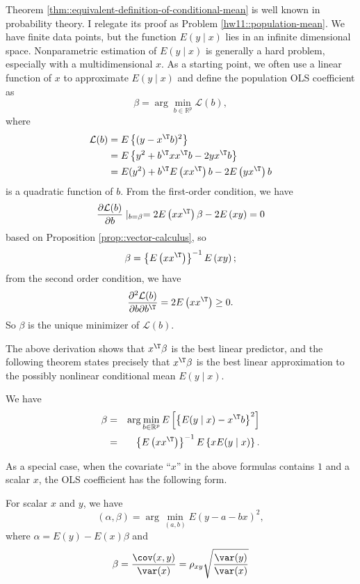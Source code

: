 Theorem \ref{thm::equivalent-definition-of-conditional-mean} is well known in probability theory. I relegate its proof as  Problem \ref{hw11::population-mean}. 
We have finite data points, but the function $E(y\mid x)$ lies in
an infinite dimensional space. Nonparametric estimation of $E(y\mid x)$
is generally a hard problem, especially with a multidimensional $x$.
As a starting point, we often use a linear function of $x$ to approximate
$E(y\mid x)$ and define the population OLS coefficient as
\[
\beta=\arg\min_{b\in\mathbb{R}^{p}} \mathcal{L}(b) ,
\]
where
\begin{align*}
\mathcal{L}(b) & =E\left\{ (y-x^{\T}b)^{2}\right\} \\
 & =E\left\{ y^{2}+b^{\T}xx^{\T}b-2yx^{\T}b\right\} \\
 & =E(y^{2})+b^{\T}E\left(xx^{\T}\right)b-2E\left(yx^{\T}\right)b 
\end{align*}
 is a quadratic function of $b$. From the first-order condition,
we have
\[
\frac{\partial\mathcal{L}(b)}{\partial b}\mid_{b=\beta}=2E\left(xx^{\T}\right)\beta-2E\left(xy\right)=0
\]
based on Proposition \ref{prop::vector-calculus}, 
so
\begin{equation}
\label{eq::pols-formula}
\beta=\left\{ E\left(xx^{\T}\right)\right\} ^{-1}E\left(xy\right);
\end{equation}
from the second order condition, we have
\[
\frac{\partial^{2}\mathcal{L}(b)}{\partial b\partial b^{\T}}=2E\left(xx^{\T}\right)\geq0.
\]
So $\beta$ is the unique minimizer of $\mathcal{L}(b)$. 


The above derivation shows that $x^{\T}\beta$ is the best linear predictor,
and the following theorem states precisely that $x^{\T}\beta$ is
the best linear approximation to the possibly nonlinear conditional mean $E(y\mid x).$
\begin{theorem}
\label{thm:bestlinear-conditionalmean}
We have
\begin{eqnarray*}
\beta &=& \arg\min_{b\in\mathbb{R}^{p}}E\left[\left\{ E(y\mid x)-x^{\T}b\right\} ^{2}\right] \\
&=& \left\{ E\left(xx^{\T}\right)\right\} ^{-1}E\left\{ xE(y\mid x)\right\} .
\end{eqnarray*}
\end{theorem}
 

As a special case, when the covariate ``$x$'' in the above formulas contains $1$ and a scalar $x$,
the OLS coefficient has the following form.
\begin{corollary}
\label{corollary:scalar-pop-ols}
For scalar $x$ and $y$, we have 
\[
(\alpha,\beta)=\arg\min_{(a,b)}E(y-a-bx)^{2},
\]
where $\alpha=E(y)-E(x)\beta$ and 
\[
\beta=\frac{\cov(x,y)}{\var(x)} = \rho_{xy} \sqrt{   \frac{\var(y)}{\var(x)}  }
\]
\end{corollary}

